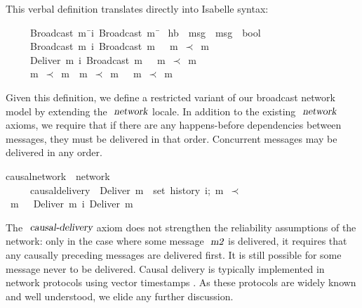 This verbal definition translates directly into Isabelle syntax:
\begin{isabelle}
~~~~{\isachardoublequoteopen}{\isasymlbrakk}\ Broadcast\ m{}\ \={\isasymsqsubset}\isactrlsup i\ Broadcast\ m{}\ \=\kill
{}\ hb\ {\isacharcolon}{\isacharcolon}\ {\isachardoublequoteopen}{\isacharprime}msg\ {\isasymRightarrow}\ {\isacharprime}msg\ {\isasymRightarrow}\ bool{\isachardoublequoteclose}\ \\
~~~~{\isachardoublequoteopen}{\isasymlbrakk}\ Broadcast\ m{}\ \>{\isasymsqsubset}\isactrlsup i\ Broadcast\ m{}\ \>{\isasymrbrakk}\ {\isasymLongrightarrow}\ m{}\ $\prec$\ m{}{\isachardoublequoteclose}\ {\isacharbar}\\
~~~~{\isachardoublequoteopen}{\isasymlbrakk}\ Deliver\ m{}\ \>{\isasymsqsubset}\isactrlsup i\ Broadcast\ m{}\ \>{\isasymrbrakk}\ {\isasymLongrightarrow}\ m{}\ $\prec$\ m{}{\isachardoublequoteclose}\ {\isacharbar}\\
~~~~{\isachardoublequoteopen}{\isasymlbrakk}\ m{}\ $\prec$\  m{}{\isacharsemicolon}\ \ m{}\ $\prec$\ m{}\ \>\>{\isasymrbrakk}\ {\isasymLongrightarrow}\ m{}\ $\prec$\ m{}{\isachardoublequoteclose}
\end{isabelle}
Given this definition, we define a restricted variant of our broadcast network model by extending the $\isa{network}$ locale.
In addition to the existing $\isa{network}$ axioms, we require that if there are any happens-before dependencies between messages, they must be delivered in that order.
Concurrent messages may be delivered in any order.
\begin{isabelle}
 causal{\isacharunderscore}network\ {\isacharequal}\ network\ {\isacharplus}\\
~~~~\ causal{\isacharunderscore}delivery{\isacharcolon}\ {\isasymlbrakk}\ {\isachardoublequoteopen}Deliver\ m{}\ {\isasymin}\ set\ {\isacharparenleft}history\ i{\isacharparenright};\ m{}\ $\prec$\ m{}\ {\isasymrbrakk}\ {\isasymLongrightarrow}\ Deliver\ m{}\ {\isasymsqsubset}\isactrlsup i\ Deliver\ m{}{\isachardoublequoteclose}
\end{isabelle}
The $\isa{causal-delivery}$ axiom does not strengthen the reliability assumptions of the network: only in the case where some message $\isa{m2}$ is delivered, it requires that any causally preceding messages are delivered first.
It is still possible for some message never to be delivered.
Causal delivery is typically implemented in network protocols using vector timestamps \cite{Schwarz:1994gl,Fidge:1988tv,Raynal:1996jl}.
As these protocols are widely known and well understood, we elide any further discussion.

